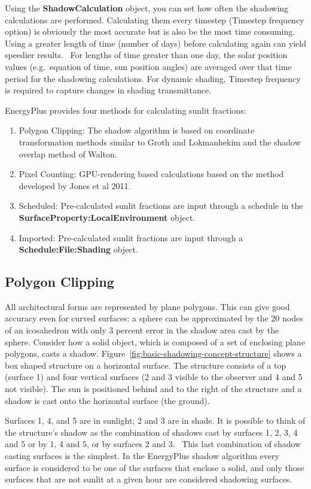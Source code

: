 Using the \textbf{ShadowCalculation} object, you can set how often the shadowing calculations are performed. Calculating them every timestep (Timestep frequency option) is obviously the most accurate but is also be the most time consuming.~ Using a greater length of time (number of days) before calculating again can yield speedier results.~ For lengths of time greater than one day, the solar position values (e.g.~equation of time, sun position angles) are averaged over that time period for the shadowing calculations. For dynamic shading, Timestep frequency is required to capture changes in shading transmittance.

EnergyPlus provides four methods for calculating sunlit fractions:

\begin{enumerate}
    \item Polygon Clipping: The shadow algorithm is based on coordinate transformation methods similar to Groth and Lokmanhekim and the shadow overlap method of Walton.
    \item Pixel Counting: GPU-rendering based calculations based on the method developed by Jones et al 2011.
    \item Scheduled: Pre-calculated sunlit fractions are input through a schedule in the \textbf{SurfaceProperty:LocalEnvironment} object.
    \item Imported: Pre-calculated sunlit fractions are input through a \textbf{Schedule:File:Shading} object.
\end{enumerate}

\subsection{Polygon Clipping}

All architectural forms are represented by plane polygons. This can give good accuracy even for curved surfaces: a sphere can be approximated by the 20 nodes of an icosahedron with only 3 percent error in the shadow area cast by the sphere. Consider how a solid object, which is composed of a set of enclosing plane polygons, casts a shadow. Figure~\ref{fig:basic-shadowing-concept-structure} shows a box shaped structure on a horizontal surface. The structure consists of a top (surface 1) and four vertical surfaces (2 and 3 visible to the observer and 4 and 5 not visible). The sun is positioned behind and to the right of the structure and a shadow is cast onto the horizontal surface (the ground).

Surfaces 1, 4, and 5 are in sunlight; 2 and 3 are in shade. It is possible to think of the structure's shadow as the combination of shadows cast by surfaces 1, 2, 3, 4 and 5 or by 1, 4 and 5, or by surfaces 2 and 3.~ This last combination of shadow casting surfaces is the simplest. In the EnergyPlus shadow algorithm every surface is considered to be one of the surfaces that enclose a solid, and only those surfaces that are not sunlit at a given hour are considered shadowing surfaces.


